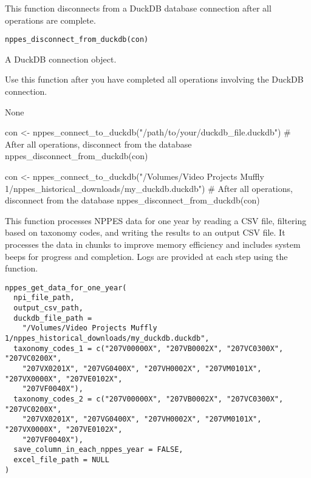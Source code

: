 \documentclass[a4paper]{book}
\begin{document}
%
\begin{Description}
This function disconnects from a DuckDB database connection after all operations are complete.
\end{Description}
%
\begin{Usage}
\begin{verbatim}
nppes_disconnect_from_duckdb(con)
\end{verbatim}
\end{Usage}
%
\begin{Arguments}
\begin{ldescription}
\item[\code{con}] A DuckDB connection object.
\end{ldescription}
\end{Arguments}
%
\begin{Details}
Use this function after you have completed all operations involving the DuckDB connection.
\end{Details}
%
\begin{Value}
None
\end{Value}
%
\begin{Examples}
\begin{ExampleCode}
con <- nppes_connect_to_duckdb("/path/to/your/duckdb_file.duckdb")
# After all operations, disconnect from the database
nppes_disconnect_from_duckdb(con)

con <- nppes_connect_to_duckdb("/Volumes/Video Projects Muffly 1/nppes_historical_downloads/my_duckdb.duckdb")
# After all operations, disconnect from the database
nppes_disconnect_from_duckdb(con)
\end{ExampleCode}
\end{Examples}
%
\begin{Description}
This function processes NPPES data for one year by reading a CSV file, filtering based on taxonomy codes,
and writing the results to an output CSV file. It processes the data in chunks to improve memory efficiency
and includes system beeps for progress and completion. Logs are provided at each step using the 
function.
\end{Description}
%
\begin{Usage}
\begin{verbatim}
nppes_get_data_for_one_year(
  npi_file_path,
  output_csv_path,
  duckdb_file_path =
    "/Volumes/Video Projects Muffly 1/nppes_historical_downloads/my_duckdb.duckdb",
  taxonomy_codes_1 = c("207V00000X", "207VB0002X", "207VC0300X", "207VC0200X",
    "207VX0201X", "207VG0400X", "207VH0002X", "207VM0101X", "207VX0000X", "207VE0102X",
    "207VF0040X"),
  taxonomy_codes_2 = c("207V00000X", "207VB0002X", "207VC0300X", "207VC0200X",
    "207VX0201X", "207VG0400X", "207VH0002X", "207VM0101X", "207VX0000X", "207VE0102X",
    "207VF0040X"),
  save_column_in_each_nppes_year = FALSE,
  excel_file_path = NULL
)
\end{verbatim}
\end{Usage}
\end{document}
